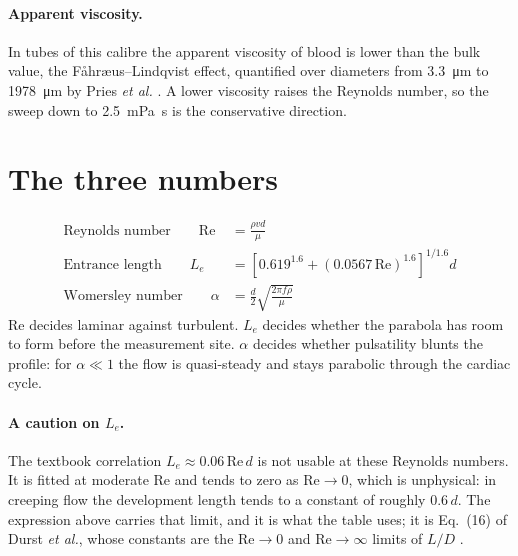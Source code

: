 \documentclass[11pt,a4paper]{article}
\begin{document}
\paragraph{Apparent viscosity.} In tubes of this calibre the apparent viscosity of blood is lower than the
bulk value, the F\aa hr\ae us--Lindqvist effect, quantified over diameters from \SI{3.3}{\micro\metre} to
\SI{1978}{\micro\metre} by Pries \textit{et al.} \cite{pries1992}. A lower viscosity raises the Reynolds
number, so the sweep down to \SI{2.5}{\milli\pascal\second} is the conservative direction.

\section*{The three numbers}
\begin{align}
\text{Reynolds number} \qquad \mathrm{Re} &= \frac{\rho v d}{\mu} \\
\text{Entrance length} \qquad L_e &= \left[0.619^{1.6} + (0.0567\,\mathrm{Re})^{1.6}\right]^{1/1.6} d \\
\text{Womersley number} \qquad \alpha &= \frac{d}{2}\sqrt{\frac{2\pi f \rho}{\mu}}
\end{align}
$\mathrm{Re}$ decides laminar against turbulent. $L_e$ decides whether the parabola has room to form before
the measurement site. $\alpha$ decides whether pulsatility blunts the profile: for $\alpha \ll 1$ the flow is
quasi-steady and stays parabolic through the cardiac cycle.

\paragraph{A caution on $L_e$.} The textbook correlation $L_e \approx 0.06\,\mathrm{Re}\,d$ is not usable at
these Reynolds numbers. It is fitted at moderate $\mathrm{Re}$ and tends to zero as $\mathrm{Re}\to 0$, which
is unphysical: in creeping flow the development length tends to a constant of roughly $0.6\,d$. The
expression above carries that limit, and it is what the table uses; it is Eq.~(16) of Durst \textit{et al.},
whose constants are the $\mathrm{Re}\to 0$ and $\mathrm{Re}\to\infty$ limits of $L/D$ \cite{durst2005}.
\end{document}
